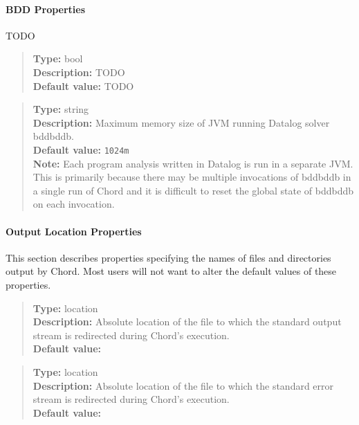 \paragraph{BDD Properties}

TODO

\begin{quote}
{\bf Type:} bool \\
{\bf Description:} TODO \\
{\bf Default value:} TODO
\end{quote}

\begin{quote}
{\bf Type:} string \\
{\bf Description:} Maximum memory size of JVM running Datalog solver bddbddb. \\
{\bf Default value:} {\tt 1024m} \\
{\bf Note:}  Each program analysis written in Datalog is run in a separate JVM.  This is primarily because there may be multiple invocations of bddbddb in a single run of Chord and it is difficult to reset the global state of bddbddb on each invocation. 
\end{quote}

\paragraph{Output Location Properties}

This section describes properties specifying the names of files and directories output by Chord.
Most users will not want to alter the default values of these properties.

\begin{quote}
{\bf Type:} location \\
{\bf Description:} Absolute location of the file to which the standard output stream is redirected during Chord's execution. \\
{\bf Default value:} 
\end{quote}

\begin{quote}
{\bf Type:} location  \\
{\bf Description:} Absolute location of the file to which the standard error stream is redirected during Chord's execution. \\
{\bf Default value:} 
\end{quote}

